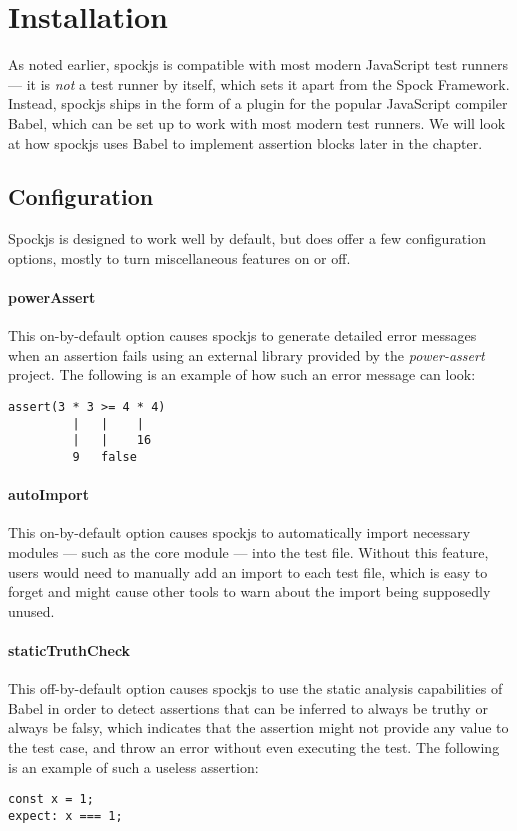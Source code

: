 \section{Installation}
As noted earlier, spockjs is compatible with most modern JavaScript test runners
--- it is \textit{not} a test runner by itself,
which sets it apart from the Spock Framework.
Instead, spockjs ships in the form of a plugin for the popular JavaScript compiler Babel,
\autocite{Babel}
which can be set up to work with most modern test runners.
\autocite{BabelSetupDoc}
We will look at how spockjs uses Babel to implement assertion blocks later in the chapter.

\subsection{Configuration}
Spockjs is designed to work well by default,
but does offer a few configuration options,
mostly to turn miscellaneous features on or off.
\autocite{SpockjsGithub}

\paragraph{powerAssert}
This on-by-default option causes spockjs to generate
detailed error messages when an assertion fails
using an external library provided by the \textit{power-assert} project.
\autocite{PowerAssertGithub}
The following is an example of how such an error message can look:
\autocite{SpockjsGithub}
\begin{verbatim}
assert(3 * 3 >= 4 * 4)
         |   |    |
         |   |    16
         9   false
\end{verbatim}

\paragraph{autoImport}
This on-by-default option causes spockjs to
automatically import necessary modules
--- such as the  core module ---
into the test file.
Without this feature, users would need to
manually add an import to each test file,
which is easy to forget and might cause
other tools to warn about the import being supposedly unused.

\paragraph{staticTruthCheck}
This off-by-default option causes spockjs to
use the static analysis capabilities of Babel
in order to detect assertions
that can be inferred to always be truthy or always be falsy,
which indicates that the assertion might not provide any value to the test case,
and throw an error without even executing the test.
The following is an example of such a useless assertion:
\begin{verbatim}
const x = 1;
expect: x === 1;
\end{verbatim}

